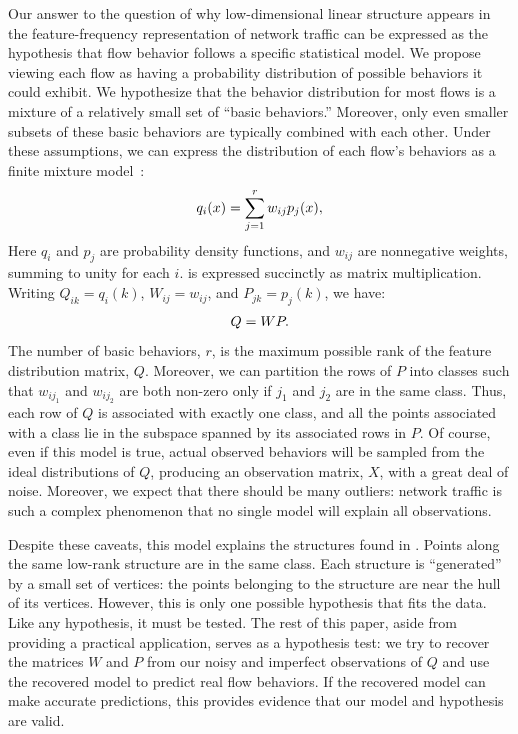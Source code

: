 \documentclass[conference]{IEEEtran}
\begin{document}
Our answer to the question of why low-dimensional linear structure appears in the feature-frequency representation of network traffic can be expressed as the hypothesis that flow behavior follows a specific statistical model.
We propose viewing each flow as having a probability distribution of possible behaviors it could exhibit.
We hypothesize that the behavior distribution for most flows is a mixture of a relatively small set of ``basic behaviors.''
Moreover, only even smaller subsets of these basic behaviors are typically combined with each other.
Under these assumptions, we can express the distribution of each flow's behaviors as a finite mixture model~\cite{McLachlan00}:
\begin{align}\eqn{mixture-model}
  q_i(x) = \sum_{j=1}^r w_{ij} p_j(x),
\end{align}
Here $q_i$ and $p_j$ are probability density functions, and $w_{ij}$ are nonnegative weights, summing to unity for each $i$.
 is expressed succinctly as matrix multiplication.
Writing $Q_{ik} = q_i(k)$, $W_{ij} = w_{ij}$, and $P_{jk} = p_j(k)$, we have:
\begin{align}\eqn{mixture-model-matrix}
  Q = WP.
\end{align}
The number of basic behaviors, $r$, is the maximum possible rank of the feature distribution matrix, $Q$.
Moreover, we can partition the rows of $P$ into classes such that $w_{ij_1}$ and $w_{ij_2}$ are both non-zero only if $j_1$ and $j_2$ are in the same class.
Thus, each row of $Q$ is associated with exactly one class, and all the points associated with a class lie in the subspace spanned by its associated rows in $P$.
Of course, even if this model is true, actual observed behaviors will be sampled from the ideal distributions of $Q$, producing an observation matrix, $X$, with a great deal of noise.
Moreover, we expect that there should be many outliers:
network traffic is such a complex phenomenon that no single model will explain all observations.

Despite these caveats, this model explains the structures found in .
Points along the same low-rank structure are in the same class.
Each structure is ``generated'' by a small set of vertices:
the points belonging to the structure are near the hull of its vertices.
However, this is only one possible hypothesis that fits the data.
Like any hypothesis, it must be tested.
The rest of this paper, aside from providing a practical application, serves as a hypothesis test:
we try to recover the matrices $W$ and $P$ from our noisy and imperfect observations of $Q$ and use the recovered model to predict real flow behaviors.
If the recovered model can make accurate predictions, this provides evidence that our model and hypothesis are valid.
\end{document}
